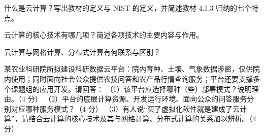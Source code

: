 \documentclass[a4paper,11pt]{article}
\begin{document}
\q 什么是云计算？写出教材的定义与 NIST 的定义，并简述教材 4.1.3 归纳的七个特点。\anslines{2.4cm}

\q 云计算的核心技术有哪几项？简述各项技术的主要内容与作用。\anslines{2.4cm}

\q 云计算与网格计算、分布式计算有何联系与区别？\anslines{2.4cm}

\newpage
{}
\q 某农业科研院所拟建设科研数据云平台：院内育种、土壤、气象数据涉密，仅供院内使用；同时面向社会公众提供农技问答和农产品行情查询服务；平台还要支撑多个课题组的应用开发。请回答：
（1）该平台应选择哪种（些）部署模式？说明理由。（4 分）
（2）平台的底层计算资源、开发运行环境、面向公众的问答服务分别对应哪种服务模式？（4 分）
（3）有人说“买了虚拟化软件就是建成了云计算”，请结合云计算的核心技术及其与网格计算、分布式计算的关系加以辨析。（4 分）\anslines{5cm}
\end{document}
